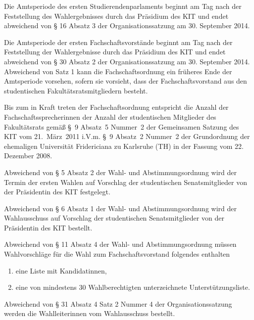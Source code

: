 
\label{amtsperiode}

Die Amtsperiode des ersten Studierendenparlaments beginnt am Tag nach der Feststellung des Wahlergebnisses durch das Präsidium des KIT und endet abweichend von § 16 Absatz 3 der Organisationssatzung am 30. September 2014.

Die Amtsperiode der ersten Fachschaftsvorstände beginnt am Tag nach der Feststellung der Wahlergebnisse durch das Präsidium des KIT und endet abweichend von § 30 Absatz 2 der Organisationssatzung am 30. September 2014. Abweichend von Satz 1 kann die Fachschaftsordnung ein früheres Ende der Amtsperiode vorsehen, sofern sie vorsieht, dass der Fachschaftsvorstand aus den studentischen Fakultätsratsmitgliedern besteht.


\label{fachschaftssprecher}

\parnumberfalse Bis zum in Kraft treten der Fachschaftsordnung entspricht die Anzahl der Fachschaftssprecherinnen der Anzahl der studentischen Mitglieder des Fakultätsrats gemäß §~9 Absatz~5 Nummer~2 der Gemeinsamen Satzung des KIT vom 21.~März~2011 i.V.m. §~9 Absatz~2 Nummer~2 der Grundordnung der ehemaligen Universität Fridericiana zu Karlsruhe (TH) in der Fassung vom 22. Dezember 2008. \parnumbertrue


\label{wahlen}

Abweichend  von § 5 Absatz 2 der Wahl- und Abstimmungsordnung wird der Termin der ersten Wahlen auf Vorschlag der studentischen Senatsmitglieder von der Präsidentin des KIT festgelegt.

Abweichend von § 6 Absatz 1 der Wahl- und Abstimmungsordnung wird der Wahlausschuss auf Vorschlag der studentischen Senatsmitglieder von der Präsidentin des KIT bestellt.

Abweichend von § 11 Absatz 4 der Wahl- und Abstimmungsordnung müssen Wahlvorschläge für die Wahl zum Fachschaftsvorstand folgendes enthalten
\begin{enumerate}
\item eine Liste mit Kandidatinnen,
\item eine von mindestens 30 Wahlberechtigten unterzeichnete Unterstützungsliste.
\end{enumerate}

Abweichend von § 31 Absatz 4 Satz 2 Nummer 4 der Organisationssatzung werden die Wahlleiterinnen vom Wahlausschuss bestellt.


